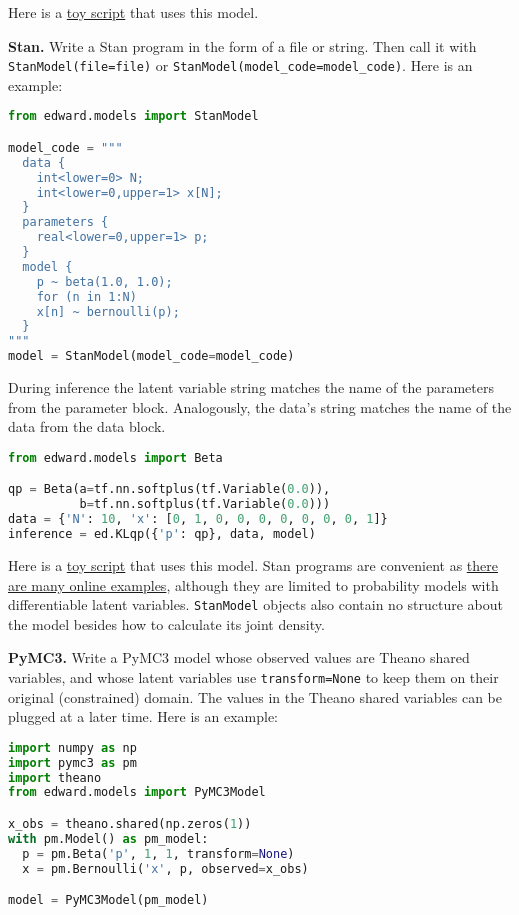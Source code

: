 Here is a
\href{https://github.com/blei-lab/edward/blob/master/examples/np_beta_bernoulli.py}
{toy script}
that uses this model.

\textbf{Stan.}
Write a Stan program in the form of a file or string. Then
call it with \texttt{StanModel(file=file)} or
\texttt{StanModel(model_code=model_code)}. Here is an example:

\begin{lstlisting}[language=Python]
from edward.models import StanModel

model_code = """
  data {
    int<lower=0> N;
    int<lower=0,upper=1> x[N];
  }
  parameters {
    real<lower=0,upper=1> p;
  }
  model {
    p ~ beta(1.0, 1.0);
    for (n in 1:N)
    x[n] ~ bernoulli(p);
  }
"""
model = StanModel(model_code=model_code)
\end{lstlisting}

During inference the latent variable string matches the name of the
parameters from the parameter block. Analogously, the data's string
matches the name of the data from the data block.

\begin{lstlisting}[language=Python]
from edward.models import Beta

qp = Beta(a=tf.nn.softplus(tf.Variable(0.0)),
          b=tf.nn.softplus(tf.Variable(0.0)))
data = {'N': 10, 'x': [0, 1, 0, 0, 0, 0, 0, 0, 0, 1]}
inference = ed.KLqp({'p': qp}, data, model)
\end{lstlisting}

Here is a
\href{https://github.com/blei-lab/edward/blob/master/examples/stan_beta_bernoulli.py}
{toy script}
that uses this model. Stan programs are convenient as
\href{https://github.com/stan-dev/example-models/wiki}
{there are many online examples},
although they are limited to probability models with differentiable
latent variables. \texttt{StanModel} objects also contain no structure about
the model besides how to calculate its joint density.

\textbf{PyMC3.}
Write a PyMC3 model whose observed values are Theano shared variables,
and whose latent variables use \texttt{transform=None} to keep them on their
original (constrained) domain.
The values in the Theano shared variables can be plugged at a later
time. Here is an example:

\begin{lstlisting}[language=Python]
import numpy as np
import pymc3 as pm
import theano
from edward.models import PyMC3Model

x_obs = theano.shared(np.zeros(1))
with pm.Model() as pm_model:
  p = pm.Beta('p', 1, 1, transform=None)
  x = pm.Bernoulli('x', p, observed=x_obs)

model = PyMC3Model(pm_model)
\end{lstlisting}

